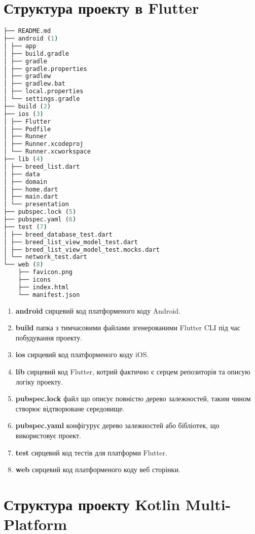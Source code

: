 \section{Структура проекту в Flutter}
\label{section.2.2}

\begin{lstlisting}[style=light, language=Python,label={lst:flutter_project_layout},caption=Flutter Project Layout]
├── README.md
├── android (1)
│ ├── app
│ ├── build.gradle
│ ├── gradle
│ ├── gradle.properties
│ ├── gradlew
│ ├── gradlew.bat
│ ├── local.properties
│ └── settings.gradle
├── build (2)
├── ios (3)
│ ├── Flutter
│ ├── Podfile
│ ├── Runner
│ ├── Runner.xcodeproj
│ └── Runner.xcworkspace
├── lib (4)
│ ├── breed_list.dart
│ ├── data
│ ├── domain
│ ├── home.dart
│ ├── main.dart
│ └── presentation
├── pubspec.lock (5)
├── pubspec.yaml (6)
├── test (7)
│ ├── breed_database_test.dart
│ ├── breed_list_view_model_test.dart
│ ├── breed_list_view_model_test.mocks.dart
│ └── network_test.dart
└── web (8)
    ├── favicon.png
    ├── icons
    ├── index.html
    └── manifest.json
\end{lstlisting}

\begin{enumerate}
    \item \textbf{android} сирцевий код платформеного коду Android.
    \item \textbf{build} папка з тимчасовими файлами згенерованими Flutter CLI під час побудування проекту.
    \item \textbf{ios} сирцевий код платформеного коду iOS.
    \item \textbf{lib} сирцевий код Flutter, котрий фактично є серцем репозиторія та описую логіку проекту.
    \item \textbf{pubspec.lock} файл що описує повністю дерево залежностей, таким чином створює відтворюване середовище.
    \item \textbf{pubspec.yaml} конфігурує дерево залежностей або бібліотек, що використовує проект.
    \item \textbf{test} сирцевий код тестів для платформи Flutter.
    \item \textbf{web} сирцевий код платформеного коду веб сторінки.
\end{enumerate}


\section{Структура проекту Kotlin Multi-Platform}
\label{section.2.3}

